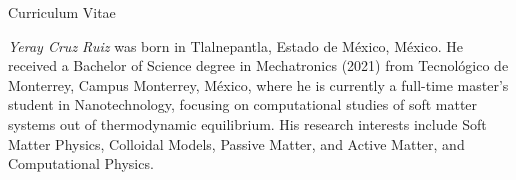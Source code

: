 \huge{Curriculum Vitae} \\
\normalsize
\vspace*{1.0 cm}


\emph{Yeray Cruz Ruiz} was born in Tlalnepantla, Estado de México, México. He received a Bachelor of Science degree in Mechatronics (2021) from Tecnológico de Monterrey, Campus Monterrey, México, where he is currently a full-time master's student in Nanotechnology, focusing on computational studies of soft matter systems out of thermodynamic equilibrium. His research interests include Soft Matter Physics, Colloidal Models, Passive Matter, and Active Matter,  and Computational Physics. 

